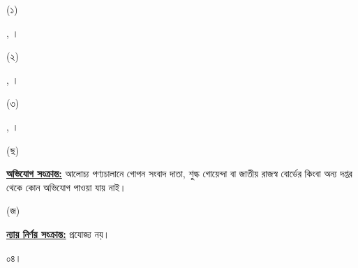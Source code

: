\documentclass[12pt]{article}
\begin{document}
\begin{minipage}[t]{0.05\linewidth}
(১)
\end{minipage}
\begin{minipage}[t]{0.85\linewidth}
{\srooof}, {\srooofd}।
\end{minipage}
\begin{minipage}[t]{0.1\linewidth}
\hspace{1em}
\end{minipage}
\begin{minipage}[t]{0.05\linewidth}
(২)
\end{minipage}
\begin{minipage}[t]{0.85\linewidth}
{\nbrfs}, {\nbrfsd}।
\end{minipage}
\begin{minipage}[t]{0.1\linewidth}
\hspace{1em}
\end{minipage}
\begin{minipage}[t]{0.05\linewidth}
(৩)
\end{minipage}
\begin{minipage}[t]{0.85\linewidth}
{\nbrosn}, {\nbrosnd}।
\\
\end{minipage}
\begin{minipage}[t]{0.05\linewidth}
\hspace{1em}
\end{minipage}
\begin{minipage}[t]{0.05\linewidth}
(ছ)
\end{minipage}
\begin{minipage}[t]{0.90\linewidth}
\underline{\textbf{অভিযোগ সংক্রান্ত:}} আলোচ্য পণ্যচালানে
গোপন সংবাদ দাতা, শুল্ক গোয়েন্দা বা
জাতীয় রাজস্ব বোর্ডের কিংবা অন্য দপ্তর থেকে
কোন অভিযোগ পাওয়া যায় নাই।
\\
\end{minipage}
\begin{minipage}[t]{0.05\linewidth}
\hspace{1em}
\end{minipage}
\begin{minipage}[t]{0.05\linewidth}
(জ)
\end{minipage}
\begin{minipage}[t]{0.90\linewidth}
\underline{\textbf{ন্যায় নির্ণয় সংক্রান্ত:}} প্রযোজ্য নয়।
\\
\end{minipage}
\begin{minipage}[t]{0.05\linewidth}
০৪।
\end{minipage}
\end{document}
